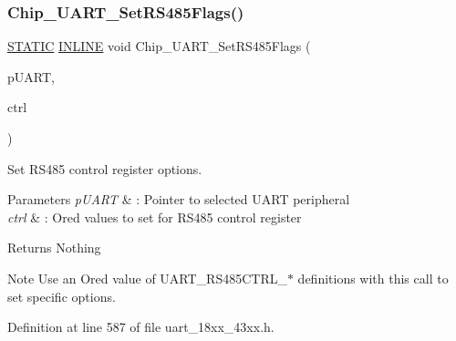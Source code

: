 \subsubsection{\texorpdfstring{Chip\+\_\+\+U\+A\+R\+T\+\_\+\+Set\+R\+S485\+Flags()}{Chip\_UART\_SetRS485Flags()}}
{\footnotesize\ttfamily \hyperlink{group___l_p_c___types___public___macros_ga10b2d890d871e1489bb02b7e70d9bdfb}{S\+T\+A\+T\+IC} \hyperlink{spifi__18xx__43xx_8h_a2eb6f9e0395b47b8d5e3eeae4fe0c116}{I\+N\+L\+I\+NE} void Chip\+\_\+\+U\+A\+R\+T\+\_\+\+Set\+R\+S485\+Flags (\begin{DoxyParamCaption}\item[{\hyperlink{struct_l_p_c___u_s_a_r_t___t}{L\+P\+C\+\_\+\+U\+S\+A\+R\+T\+\_\+T} $\ast$}]{p\+U\+A\+RT,  }\item[{uint32\+\_\+t}]{ctrl }\end{DoxyParamCaption})}



Set R\+S485 control register options. 


\begin{DoxyParams}{Parameters}
{\em p\+U\+A\+RT} & \+: Pointer to selected U\+A\+RT peripheral \\
\hline
{\em ctrl} & \+: Or\textquotesingle{}ed values to set for R\+S485 control register \\
\hline
\end{DoxyParams}
\begin{DoxyReturn}{Returns}
Nothing 
\end{DoxyReturn}
\begin{DoxyNote}{Note}
Use an Or\textquotesingle{}ed value of U\+A\+R\+T\+\_\+\+R\+S485\+C\+T\+R\+L\+\_\+$\ast$ definitions with this call to set specific options. 
\end{DoxyNote}


Definition at line 587 of file uart\+\_\+18xx\+\_\+43xx.\+h.

\mbox{\label{group___u_a_r_t__18_x_x__43_x_x_ga67cb62756a430156bc754a57c72372bd}} 
